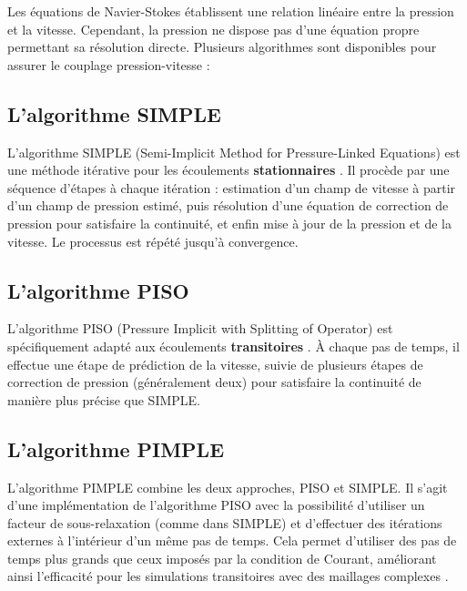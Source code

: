Les équations de Navier-Stokes établissent une relation linéaire entre la pression et la vitesse. Cependant, la pression ne dispose pas d'une équation propre permettant sa résolution directe. Plusieurs algorithmes sont disponibles pour assurer le couplage pression-vitesse \cite{patankar1972calculation} :

\subsection{L'algorithme SIMPLE}
\label{subsec:simple}

L'algorithme SIMPLE (Semi-Implicit Method for Pressure-Linked Equations) est une méthode itérative pour les écoulements \textbf{stationnaires} \cite{caretto1973two}. Il procède par une séquence d'étapes à chaque itération : estimation d'un champ de vitesse à partir d'un champ de pression estimé, puis résolution d'une équation de correction de pression pour satisfaire la continuité, et enfin mise à jour de la pression et de la vitesse. Le processus est répété jusqu'à convergence.

\subsection{L'algorithme PISO}
\label{subsec:piso}

L'algorithme PISO (Pressure Implicit with Splitting of Operator) est spécifiquement adapté aux écoulements \textbf{transitoires} \cite{issa1986solution}. À chaque pas de temps, il effectue une étape de prédiction de la vitesse, suivie de plusieurs étapes de correction de pression (généralement deux) pour satisfaire la continuité de manière plus précise que SIMPLE.

\subsection{L'algorithme PIMPLE}
\label{subsec:pimple}

L'algorithme PIMPLE combine les deux approches, PISO et SIMPLE. Il s'agit d'une implémentation de l'algorithme PISO avec la possibilité d'utiliser un facteur de sous-relaxation (comme dans SIMPLE) et d'effectuer des itérations externes à l'intérieur d'un même pas de temps. Cela permet d'utiliser des pas de temps plus grands que ceux imposés par la condition de Courant, améliorant ainsi l'efficacité pour les simulations transitoires avec des maillages complexes \cite{holzmann2017mathematics}.

